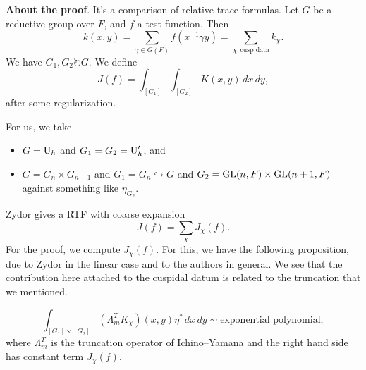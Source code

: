 \documentclass[reqno]{amsart} 
\begin{document}
\textbf{About the proof}.  It's a comparison of relative trace formulas.  Let $G$ be a reductive group over $F$, and $f$ a test function.  Then
\begin{equation*}
  k (x, y) = \sum_{\gamma \in G (F) } f (x^{-1} \gamma y)
  = \sum_{\chi : \text{cusp data}} k_\chi.
\end{equation*}
We have $G_1, G_2 \circlearrowright G$.  We define
\begin{equation*}
J (f) = \int_{[G_1 ]} \int_{[G_2]} K (x,y) \, d x \, d y,
\end{equation*}
after some regularization.

For us, we take
\begin{itemize}
\item $G = \operatorname{U}_h$ and $G_1 = G_2 = \operatorname{U} '_h $, and
\item $G = G_{n } \times G_{n + 1}$ and $G_1 = G_n \hookrightarrow G$ and $G_2 = \operatorname{GL} (n, F) \times \operatorname{GL} (n + 1, F)$ against something like $\eta_{G_2}$.
\end{itemize}
Zydor gives a RTF with coarse expansion
\begin{equation*}
J (f) = \sum_{\chi } J_\chi (f).
\end{equation*}
For the proof, we compute $J_\chi (f)$.  For this, we have the following proposition, due to Zydor in the linear case and to the authors in general.  We see that the contribution here attached to the cuspidal datum is related to the truncation that we mentioned.
\begin{proposition}
  \begin{equation*}
    \int_{[G_1 ] \times [G_2 ]}
    \left( \Lambda_m^T K_\chi  \right) (x, y ) \eta^? \,d x \,d y \sim \text{exponential polynomial},
  \end{equation*}
  where $\Lambda_m^T $ is the truncation operator of Ichino--Yamana and the right hand side has constant term $J_\chi (f) $.
\end{proposition}
\end{document}
